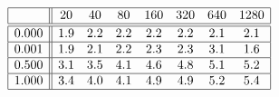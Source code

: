 \[
\begin{array}{|c||ccccccc|}
\hline 
& 20 & 40 & 80 & 160 & 320 & 640 & 1280\\
\hline \hline 
0.000 & 1.9 & 2.2 & 2.2 & 2.2 & 2.2 & 2.1 & 2.1 \\ \hline 
0.001 & 1.9 & 2.1 & 2.2 & 2.3 & 2.3 & 3.1 & 1.6 \\ \hline 
0.500 & 3.1 & 3.5 & 4.1 & 4.6 & 4.8 & 5.1 & 5.2 \\ \hline 
1.000 & 3.4 & 4.0 & 4.1 & 4.9 & 4.9 & 5.2 & 5.4 \\ \hline 
\end{array}
\]


